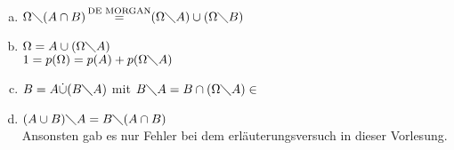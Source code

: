 \bws \\
\begin{enumerate}[a) ]
	\item $\Omega\diagdown(A\cap B) \mathop{=}\limits^{\textrm{DE MORGAN}} 
		(\Omega \diagdown A) \cup (\Omega \diagdown B)$
	\item $\Omega = A \cup ( \Omega \diagdown A)$ \\
		$1=p(\Omega) = p(A) + p(\Omega \diagdown A)$
	\item $B=A\dot{\cup}(B\diagdown A)$ mit $B\diagdown A = B \cap (\Omega 
		\diagdown A) \in$  \normalfont{}
	\item $(A\cup B)\diagdown A = B \diagdown (A\cap B)$\\
		Ansonsten gab es nur Fehler bei dem erläuterungsversuch in dieser Vorlesung.
\end{enumerate}